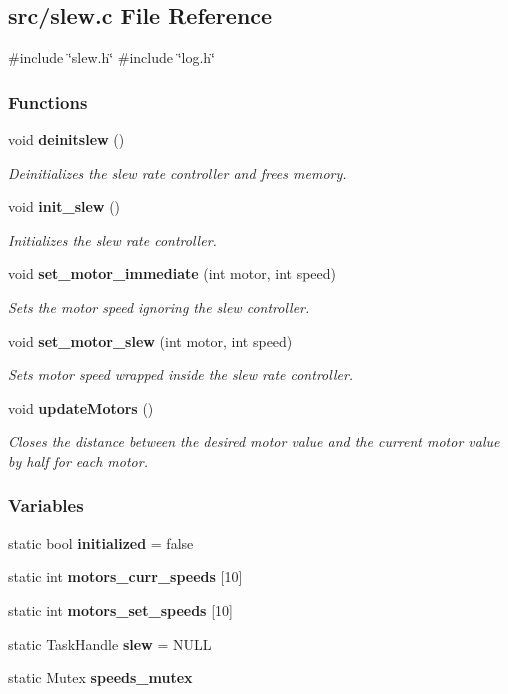 \subsection{src/slew.c File Reference}
\label{slew_8c}
{\ttfamily \#include \char`\"{}slew.\+h\char`\"{}}\newline
{\ttfamily \#include \char`\"{}log.\+h\char`\"{}}\newline
\subsubsection*{Functions}
\begin{DoxyCompactItemize}
\item 
void \textbf{ deinitslew} ()
\begin{DoxyCompactList}\small\item\em Deinitializes the slew rate controller and frees memory. \end{DoxyCompactList}\item 
void \textbf{ init\+\_\+slew} ()
\begin{DoxyCompactList}\small\item\em Initializes the slew rate controller. \end{DoxyCompactList}\item 
void \textbf{ set\+\_\+motor\+\_\+immediate} (int motor, int speed)
\begin{DoxyCompactList}\small\item\em Sets the motor speed ignoring the slew controller. \end{DoxyCompactList}\item 
void \textbf{ set\+\_\+motor\+\_\+slew} (int motor, int speed)
\begin{DoxyCompactList}\small\item\em Sets motor speed wrapped inside the slew rate controller. \end{DoxyCompactList}\item 
void \textbf{ update\+Motors} ()
\begin{DoxyCompactList}\small\item\em Closes the distance between the desired motor value and the current motor value by half for each motor. \end{DoxyCompactList}\end{DoxyCompactItemize}
\subsubsection*{Variables}
\begin{DoxyCompactItemize}
\item 
static bool \textbf{ initialized} = false
\item 
static int \textbf{ motors\+\_\+curr\+\_\+speeds} [10]
\item 
static int \textbf{ motors\+\_\+set\+\_\+speeds} [10]
\item 
static Task\+Handle \textbf{ slew} = N\+U\+LL
\item 
static Mutex \textbf{ speeds\+\_\+mutex}
\end{DoxyCompactItemize}


